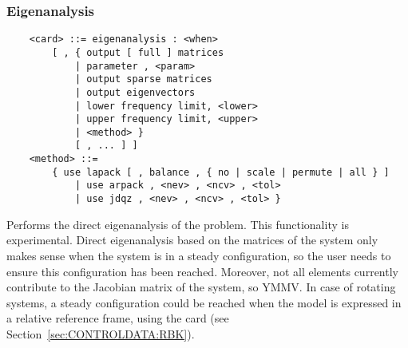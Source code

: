 \subsubsection{Eigenanalysis}
\label{sec:IVP:eigenanalysis}
\begin{verbatim}
    <card> ::= eigenanalysis : <when>
        [ , { output [ full ] matrices
            | parameter , <param>
            | output sparse matrices
            | output eigenvectors
            | lower frequency limit, <lower>
            | upper frequency limit, <upper>
            | <method> }
            [ , ... ] ]
    <method> ::=
        { use lapack [ , balance , { no | scale | permute | all } ]
            | use arpack , <nev> , <ncv> , <tol>
            | use jdqz , <nev> , <ncv> , <tol> } 
\end{verbatim}
Performs the direct eigenanalysis of the problem.
This functionality is experimental.
Direct eigenanalysis based on the matrices of the system
only makes sense when the system is in a steady configuration,
so the user needs to ensure this configuration has been reached.
Moreover, not all elements currently contribute to the Jacobian
matrix of the system, so YMMV.
In case of rotating systems, a steady configuration could be reached
when the model is expressed in a relative reference frame,
using the  card
(see Section~\ref{sec:CONTROLDATA:RBK}).

